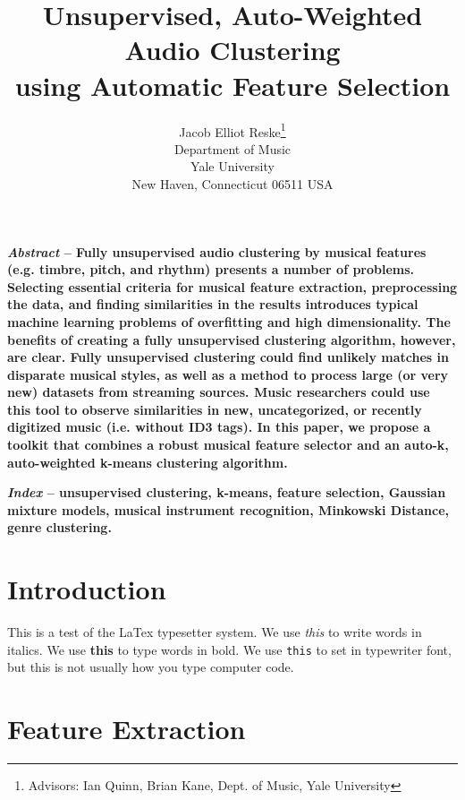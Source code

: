 \documentclass[10pt,twocolumn]{article}
\begin{document}
\title{\huge{\textbf{Unsupervised, Auto-Weighted Audio Clustering\\ using Automatic Feature Selection}}}

\author{Jacob Elliot Reske\thanks{Advisors: Ian Quinn, Brian Kane, Dept. of Music, Yale University} \\
Department of Music \\
Yale University \\
New Haven, Connecticut 06511 USA}

\maketitle

\textbf{\emph{Abstract} -- Fully unsupervised audio clustering by musical features (e.g. timbre, pitch, and rhythm) presents a number of problems. Selecting essential criteria for musical feature extraction, preprocessing the data, and finding similarities in the results introduces typical machine learning problems of overfitting and high dimensionality. The benefits of creating a fully unsupervised clustering algorithm, however, are clear. Fully unsupervised clustering could find unlikely matches in disparate musical styles, as well as a method to process large (or very new) datasets from streaming sources. Music researchers could use this tool to observe similarities in new, uncategorized, or recently digitized music (i.e. without ID3 tags). In this paper, we propose a toolkit that combines a robust musical feature selector and an auto-k, auto-weighted k-means clustering algorithm.}

\textbf{\emph{Index} -- unsupervised clustering, k-means, feature selection, Gaussian mixture models, musical instrument recognition, Minkowski Distance, genre clustering.}



\section{Introduction}


This is a test of the LaTex typesetter system.
We use \emph{this} to write words in italics.
We use \textbf{this} to type words in bold.
We use \texttt{this} to set in typewriter font, but this is not usually how you type computer code.


\section{Feature Extraction}
\label{sec:feature}
\end{document}
